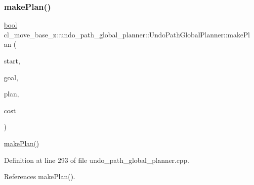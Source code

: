 \mbox{\label{classcl__move__base__z_1_1undo__path__global__planner_1_1UndoPathGlobalPlanner_aca09f640e4bda4d5ccc9613276fd3f71}} 
\subsubsection{\texorpdfstring{make\+Plan()}{makePlan()}\hspace{0.1cm}{\footnotesize\ttfamily [2/2]}}
{\footnotesize\ttfamily \hyperlink{classbool}{bool} cl\+\_\+move\+\_\+base\+\_\+z\+::undo\+\_\+path\+\_\+global\+\_\+planner\+::\+Undo\+Path\+Global\+Planner\+::make\+Plan (\begin{DoxyParamCaption}\item[{const geometry\+\_\+msgs\+::\+Pose\+Stamped \&}]{start,  }\item[{const geometry\+\_\+msgs\+::\+Pose\+Stamped \&}]{goal,  }\item[{std\+::vector$<$ geometry\+\_\+msgs\+::\+Pose\+Stamped $>$ \&}]{plan,  }\item[{double \&}]{cost }\end{DoxyParamCaption})}

\hyperlink{classcl__move__base__z_1_1undo__path__global__planner_1_1UndoPathGlobalPlanner_a46034d27c0811abae440009457a7f8b0}{make\+Plan()} 

Definition at line 293 of file undo\+\_\+path\+\_\+global\+\_\+planner.\+cpp.



References make\+Plan().



